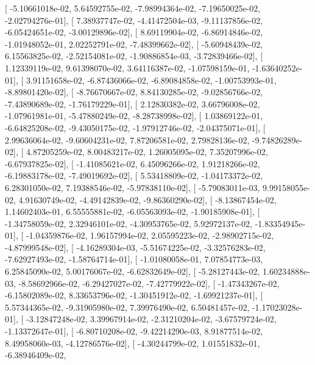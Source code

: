 \documentclass{article}
\begin{document}
       [ -5.10661018e-02,   5.64592755e-02,  -7.98994364e-02,
         -7.19650025e-02,  -2.02794276e-01],
       [  7.38937747e-02,  -4.41472504e-03,  -9.11137856e-02,
         -6.05424651e-02,  -3.00129896e-02],
       [  8.69119904e-02,  -6.86914846e-02,  -1.01948052e-01,
          2.02252791e-02,  -7.48399662e-02],
       [ -5.60948439e-02,   6.15563825e-02,  -2.52154081e-02,
         -1.90886854e-03,  -3.72839466e-02],
       [  1.12339119e-02,   9.61398070e-02,   3.64116387e-02,
         -1.07598159e-01,  -1.63640252e-01],
       [  3.91151658e-02,  -6.87436066e-02,  -6.89084858e-02,
         -1.00753993e-01,  -8.89801420e-02],
       [ -8.76670667e-02,   8.84130285e-02,  -9.02856766e-02,
         -7.43890689e-02,  -1.76179229e-01],
       [  2.12830382e-02,   3.66796008e-02,  -1.07961981e-01,
         -5.47880249e-02,  -8.28738998e-02],
       [  1.03869122e-01,  -6.64825208e-02,  -9.43050175e-02,
         -1.97912746e-02,  -2.04375071e-01],
       [  2.99636064e-02,  -9.60604231e-02,   7.87206581e-02,
          2.79828136e-02,  -9.74826289e-02],
       [  4.87205259e-02,   8.00483217e-02,   1.26005095e-02,
          7.35207996e-02,  -6.67937825e-02],
       [ -1.41085621e-02,   6.45096266e-02,   1.91218266e-02,
         -6.19883178e-02,  -7.49019692e-02],
       [  5.53418809e-02,  -1.04173372e-02,   6.28301050e-02,
          7.19388546e-02,  -5.97838110e-02],
       [ -5.79083011e-03,   9.99158055e-02,   4.91630749e-02,
         -4.49142839e-02,  -9.86360290e-02],
       [ -8.13867454e-02,   1.14602403e-01,   6.55555881e-02,
         -6.05563093e-02,  -1.90185908e-01],
       [ -1.34758059e-02,   2.32946101e-02,  -4.30953765e-02,
          5.92972137e-02,  -1.83354945e-01],
       [ -1.04359876e-02,   1.96157994e-02,   2.05595223e-02,
         -2.98902715e-02,  -4.87999548e-02],
       [ -4.16289304e-03,  -5.51674225e-02,  -3.32576283e-02,
         -7.62927493e-02,  -1.58764714e-01],
       [ -1.01080058e-01,   7.07854773e-03,   6.25845090e-02,
          5.00176067e-02,  -6.62832649e-02],
       [ -5.28127443e-02,   1.60234888e-03,  -8.58692966e-02,
         -6.29427027e-02,  -7.42779922e-02],
       [ -1.47343267e-02,  -6.15802089e-02,   8.33653796e-02,
         -1.30451912e-02,  -1.69921237e-01],
       [  5.57344365e-02,  -9.31905980e-02,   7.39976490e-02,
          6.50481457e-02,  -1.17023028e-01],
       [ -3.12847248e-02,   3.39967914e-02,  -2.31210204e-02,
         -3.67579724e-02,  -1.13372647e-01],
       [ -6.80710208e-02,  -9.42214290e-03,   8.91877514e-02,
          8.49958060e-03,  -4.12786576e-02],
       [ -4.30244799e-02,   1.01551832e-01,  -6.38946409e-02,
\end{document}
